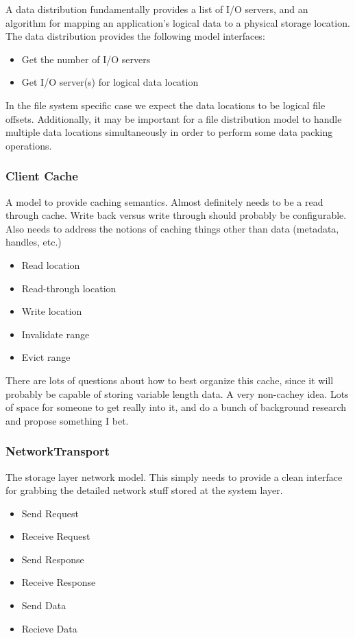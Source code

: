 \documentclass[11pt]{article}
\begin{document}
A data distribution fundamentally provides a list of I/O servers, and an
algorithm for mapping an application's logical data to a physical storage
location.  The data distribution provides the following model interfaces:

\begin{itemize}
\item Get the number of I/O servers
\item Get I/O server(s) for logical data location
\end{itemize}

In the file system specific case we expect the data locations to be logical 
file offsets.  Additionally, it may be important for a file distribution
model to handle multiple data locations simultaneously in order to perform
some data packing operations.

\subsubsection{Client Cache}
A model to provide caching semantics.  Almost definitely needs to be a read
through cache.  Write back versus write through should probably be
configurable.  Also needs to address the notions of caching things other than
data (metadata, handles, etc.)

\begin{itemize}
\item Read location
\item Read-through location
\item Write location
\item Invalidate range
\item Evict range
\end{itemize}

There are lots of questions about how to best organize this cache, since it
will probably be capable of storing variable length data.  A very non-cachey
idea.  Lots of space for someone to get really into it, and do a bunch of
background research and propose something I bet.

\subsubsection{NetworkTransport}
The storage layer network model.  This simply needs to provide a clean
interface for grabbing the detailed network stuff stored at the system layer.

\begin{itemize}
\item Send Request
\item Receive Request
\item Send Response
\item Receive Response
\item Send Data
\item Recieve Data
\end{itemize}
\end{document}
